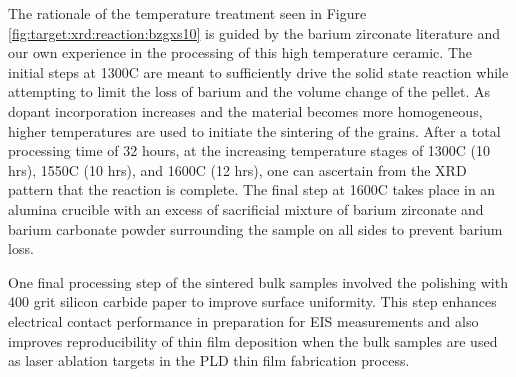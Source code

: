 The rationale of the temperature treatment seen in Figure \ref{fig:target:xrd:reaction:bzgxs10} is guided by the barium zirconate literature and our own experience in the processing of this high temperature ceramic. The initial steps at 1300\textdegree C are meant to sufficiently drive the solid state reaction while attempting to limit the loss of barium and the volume change of the pellet. As dopant incorporation increases and the material becomes more homogeneous, higher temperatures are used to initiate the sintering of the grains. After a total processing time of 32 hours, at the increasing temperature stages of 1300\textdegree C (10 hrs), 1550\textdegree C (10 hrs), and 1600\textdegree C (12 hrs), one can ascertain from the XRD pattern that the reaction is complete. The final step at 1600\textdegree C takes place in an alumina crucible with an excess of sacrificial mixture of barium zirconate and barium carbonate powder surrounding the sample on all sides to prevent barium loss.


One final processing step of the sintered bulk samples involved the polishing with 400 grit silicon carbide paper to improve surface uniformity. This step enhances electrical contact performance in preparation for EIS measurements and also improves reproducibility of thin film deposition when the bulk samples are used as laser ablation targets in the PLD thin film fabrication process. 


